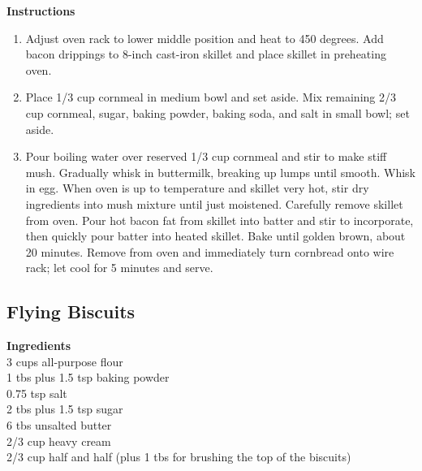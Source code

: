 \documentclass{article}
\numberwithin{figure}{section}
\numberwithin{equation}{section}
\begin{document}
{\bf Instructions}
\begin{enumerate}
\item Adjust oven rack to lower middle position and heat to 450 degrees.  Add bacon drippings to 8-inch cast-iron skillet and place skillet in preheating oven.

\item Place 1/3 cup cornmeal in medium bowl and set aside.  Mix remaining 2/3 cup cornmeal, sugar, baking powder, baking soda, and salt in small bowl; set aside.
	
\item Pour boiling water over reserved 1/3 cup cornmeal and stir to make stiff mush.  Gradually whisk in buttermilk, breaking up lumps until smooth.  Whisk in egg.  When oven is up to temperature and skillet very hot, stir dry ingredients into mush mixture until just moistened.  Carefully remove skillet from oven.  Pour hot bacon fat from skillet into batter and stir to incorporate, then quickly pour batter into heated skillet.  Bake until golden brown, about 20 minutes.  Remove from oven and immediately turn cornbread onto wire rack; let cool for 5 minutes and serve.
\end{enumerate}

\pagebreak
\subsection{Flying Biscuits}
{\bf Ingredients}\\
3 cups all-purpose flour\\
1 tbs plus 1.5 tsp baking powder\\
0.75 tsp salt\\
2 tbs plus 1.5 tsp sugar\\
6 tbs unsalted butter\\
2/3 cup heavy cream\\
2/3 cup half and half (plus 1 tbs for brushing the top of the biscuits)\\
\end{document}
